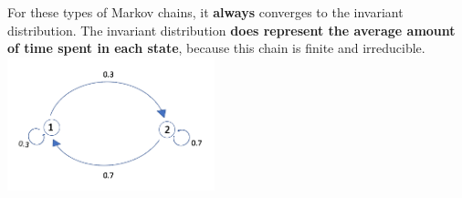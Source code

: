 \begin{enumerate}[label=(\alph*)]
\begin{solution}[2cm]
For these types of Markov chains, it \textbf{always} converges to the invariant distribution. The invariant distribution \textbf{does represent the average amount of time spent in each state}, because this chain is finite and irreducible. \\
\includegraphics[width=6cm]{aperiodic.png}
\end{solution}
\end{enumerate}